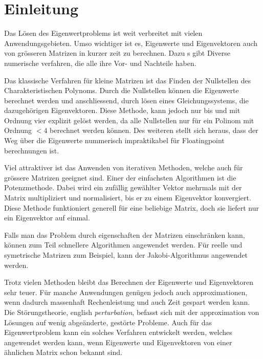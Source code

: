 %
%
%
\section{Einleitung\label{ew:section:einleitung}}

Das Lösen des Eigenwertproblems ist  weit verbreitet mit vielen Anwendungsgebieten.
Umso wichtiger ist es, Eigenwerte und Eigenvektoren auch von grösseren Matrizen in kurzer zeit zu berechnen.
Dazu s gibt Diverse numerische verfahren, die alle ihre Vor- und Nachteile haben.

Das klassische Verfahren für kleine Matrizen ist das Finden der Nullstellen des Charakteristischen Polynoms.
Durch die Nullstellen können die Eigenwerte berechnet werden und anschliessend, durch lösen eines Gleichungssystems, die dazugehörigen Eigenvektoren.
Diese Methode, kann jedoch nur bis und mit Ordnung vier explizit gelöst werden, da alle Nullstellen nur für ein Polinom mit Ordnung $< 4$ berechnet werden können.
Des weiteren stellt sich heraus, dass der Weg über die Eigenwerte nummerisch impraktikabel für Floatingpoint berechnungen ist. 

Viel attraktiver ist das Anwenden von iterativen Methoden, welche auch für grössere Matrizen geeignet sind.
Einer der einfachsten Algorithmen ist die Potenzmethode.
Dabei wird ein zufällig gewählter Vektor mehrmals mit der Matrix multipliziert und normalisiert, bis er zu einem Eigenvektor konvergiert.
Diese Methode funktioniert generell für eine beliebige Matrix, doch sie liefert nur ein Eigenvektor auf einmal.

Falls man das Problem durch eigenschaften der Matrizen einschränken kann, können zum Teil schnellere Algorithmen angewendet werden.
Für reelle und symetrische Matrizen zum Beispiel, kann der Jakobi-Algorithmus angewendet werden. %

Trotz vielen Methoden bleibt das Berechnen der Eigenwerte und Eigenvektoren sehr teuer.
Für manche Anwendungen genügen jedoch auch approximationen, wenn dadurch massenhaft Rechenleistung und auch Zeit gespart werden kann.
Die Störungstheorie, english \textit{perturbation}, befasst sich mit der approximation von Lösungen auf wenig abgeänderte, gestörte Probleme.
Auch für das Eigenwertproblem kann ein solches Verfahren entwickelt werden, welches angewendet werden kann, wenn Eigenwerte und Eigenvektoren von einer ähnlichen Matrix schon bekannt sind.